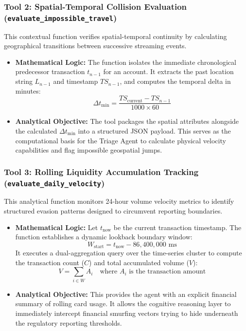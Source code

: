 \documentclass[12pt]{report}
\begin{document}
\subsubsection{Tool 2: Spatial-Temporal Collision Evaluation (\texttt{evaluate\_impossible\_travel})}
This contextual function verifies spatial-temporal continuity by calculating geographical transitions between successive streaming events.
\begin{itemize}
    \item \textbf{Mathematical Logic:} The function isolates the immediate chronological predecessor transaction $t_{n-1}$ for an account. It extracts the past location string $L_{n-1}$ and timestamp $TS_{n-1}$, and computes the temporal delta in minutes:
    $$
        \Delta t_{\text{min}} = \frac{TS_{\text{current}} - TS_{n-1}}{1000 \times 60}
    $$
    \item \textbf{Analytical Objective:} The tool packages the spatial attributes alongside the calculated $\Delta t_{\text{min}}$ into a structured JSON payload. This serves as the computational basis for the Triage Agent to calculate physical velocity capabilities and flag impossible geospatial jumps.
\end{itemize}

\subsubsection{Tool 3: Rolling Liquidity Accumulation Tracking (\texttt{evaluate\_daily\_velocity})}
This analytical function monitors 24-hour volume velocity metrics to identify structured evasion patterns designed to circumvent reporting boundaries.
\begin{itemize}
    \item \textbf{Mathematical Logic:} Let $t_{\text{now}}$ be the current transaction timestamp. The function establishes a dynamic lookback boundary window:
    $$
        W_{\text{start}} = t_{\text{now}} - 86,400,000 \text{ ms}
    $$
    It executes a dual-aggregation query over the time-series cluster to compute the transaction count ($C$) and total accumulated volume ($V$):
    $$
        V = \sum_{i \in W} A_i \quad \text{where } A_i \text{ is the transaction amount}
    $$
    \item \textbf{Analytical Objective:} This provides the agent with an explicit financial summary of rolling card usage. It allows the cognitive reasoning layer to immediately intercept financial smurfing vectors trying to hide underneath the regulatory reporting thresholds.
\end{itemize}
\end{document}
